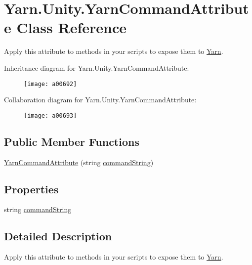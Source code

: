 \hypertarget{a00172}{\section{Yarn.\-Unity.\-Yarn\-Command\-Attribute Class Reference}
\label{a00172}
}


Apply this attribute to methods in your scripts to expose them to \hyperlink{a00050}{Yarn}.  




Inheritance diagram for Yarn.\-Unity.\-Yarn\-Command\-Attribute\-:
\nopagebreak
\begin{figure}[H]
\begin{center}
\leavevmode
\texttt{[image: a00692]}
\end{center}
\end{figure}


Collaboration diagram for Yarn.\-Unity.\-Yarn\-Command\-Attribute\-:
\nopagebreak
\begin{figure}[H]
\begin{center}
\leavevmode
\texttt{[image: a00693]}
\end{center}
\end{figure}
\subsection*{Public Member Functions}
\begin{DoxyCompactItemize}
\item 
\hyperlink{a00172_a9c0d57cd72c091f63895944959e98330}{Yarn\-Command\-Attribute} (string \hyperlink{a00172_a6d513a725c819ffcdaa9c5788472ec8d}{command\-String})
\end{DoxyCompactItemize}
\subsection*{Properties}
\begin{DoxyCompactItemize}
\item 
string \hyperlink{a00172_a6d513a725c819ffcdaa9c5788472ec8d}{command\-String}
\end{DoxyCompactItemize}


\subsection{Detailed Description}
Apply this attribute to methods in your scripts to expose them to \hyperlink{a00050}{Yarn}. 

